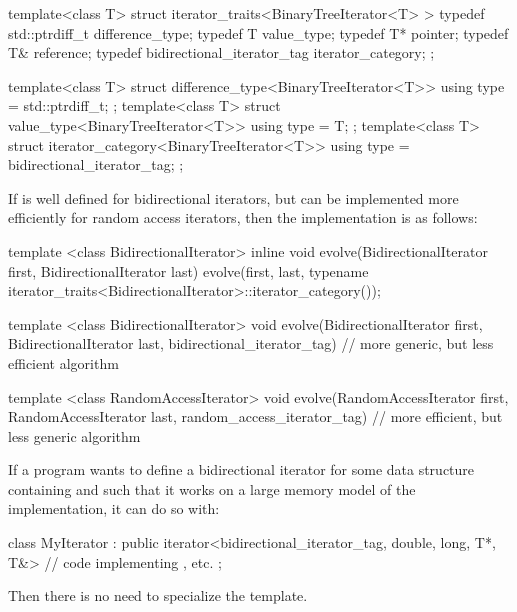 \begin{removedblock}
\begin{codeblock}
template<class T> struct iterator_traits<BinaryTreeIterator<T> > {
  typedef std::ptrdiff_t difference_type;
  typedef T value_type;
  typedef T* pointer;
  typedef T& reference;
  typedef bidirectional_iterator_tag iterator_category;
};
\end{codeblock}
\end{removedblock}
\begin{addedblock}
\begin{codeblock}
template<class T> struct difference_type<BinaryTreeIterator<T>> {
  using type = std::ptrdiff_t;
};
template<class T> struct value_type<BinaryTreeIterator<T>> {
  using type = T;
};
template<class T> struct iterator_category<BinaryTreeIterator<T>> {
  using type = bidirectional_iterator_tag;
};
\end{codeblock}
\end{addedblock}

\exitexample

{\color{oldoldclr}
\pnum
\enterexample
If
is well defined for bidirectional iterators, but can be implemented more
efficiently for random access iterators, then the implementation is as
follows:

\begin{codeblock}
template <class BidirectionalIterator>
inline void
evolve(BidirectionalIterator first, BidirectionalIterator last) {
  evolve(first, last,
    typename iterator_traits<BidirectionalIterator>::iterator_category());
}

template <class BidirectionalIterator>
void evolve(BidirectionalIterator first, BidirectionalIterator last,
  bidirectional_iterator_tag) {
  // more generic, but less efficient algorithm
}

template <class RandomAccessIterator>
void evolve(RandomAccessIterator first, RandomAccessIterator last,
  random_access_iterator_tag) {
  // more efficient, but less generic algorithm
}
\end{codeblock}
\exitexample

\pnum
\enterexample
If a \Cpp program wants to define a bidirectional iterator for some data structure containing
and such that it
works on a large memory model of the implementation, it can do so with:

\begin{codeblock}
class MyIterator :
  public iterator<bidirectional_iterator_tag, double, long, T*, T&> {
  // code implementing \tcode{++}, etc.
};
\end{codeblock}

\pnum
Then there is no need to specialize the
 template.
\exitexample
} %

